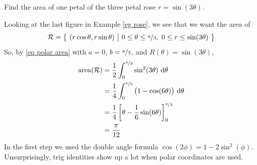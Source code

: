 \begin{eg}\label{eg area rose}
Find the area of one petal of the three petal rose
$r=\sin(3\theta)$.

\soln Looking at the last figure in Example \ref{eg rose},
we see that we want the area of 
\begin{equation*}
\mathcal{R}=\big\{ \ (r\cos\theta,r\sin\theta)\ \big|\ 0\le\theta\le \nicefrac{\pi}{3},\  
              0\le r\le \sin(3\theta)\ \big\}
\end{equation*}
So, by \eqref{eq polar area} with $a=0$, $b=\nicefrac{\pi}{3}$,
and $R(\theta) =\sin(3\theta)$,
\begin{align*}
\text{area}(\mathcal{R}) 
  &=\frac{1}{2} \int_0^{\nicefrac{\pi}{3}} \sin^2(3\theta)\  \mathrm{d}\theta \\
  &=\frac{1}{4} \int_0^{\nicefrac{\pi}{3}} \big(1-\cos(6\theta)\big)
                           \  \mathrm{d}\theta\\
  &= \frac{1}{4}\left[\theta -\frac{1}{6}\sin(6\theta)\right]
                     _0^{\nicefrac{\pi}{3}}     \\
  &=\frac{\pi}{12}
\end{align*}
In the first step we used the double angle formula 
$\cos(2\phi) = 1-2\sin^2(\phi)$. Unsurprisingly, trig identities
show up a lot when polar coordinates are used.  
\end{eg}

